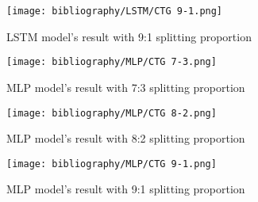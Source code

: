 \documentclass{ieeeojies}
\begin{document}
\begin{figure}[H]
  \centering
  \begin{minipage}{0.8\linewidth}
    \centering
    \texttt{[image: bibliography/LSTM/CTG 9-1.png]}
    \caption{LSTM model's result with 9:1 splitting proportion}
    \label{fig8}
  \end{minipage}
\end{figure}


\begin{figure}[H]
  \centering
  \begin{minipage}{0.8\linewidth}
    \centering
    \texttt{[image: bibliography/MLP/CTG 7-3.png]}
    \caption{MLP model's result with 7:3 splitting proportion}
    \label{fig8}
  \end{minipage}
\end{figure}

\begin{figure}[H]
  \centering
  \begin{minipage}{0.8\linewidth}
    \centering
    \texttt{[image: bibliography/MLP/CTG 8-2.png]}
    \caption{MLP model's result with 8:2 splitting proportion}
    \label{fig8}
  \end{minipage}
\end{figure}

\begin{figure}[H]
  \centering
  \begin{minipage}{0.8\linewidth}
    \centering
    \texttt{[image: bibliography/MLP/CTG 9-1.png]}
    \caption{MLP model's result with 9:1 splitting proportion}
    \label{fig8}
  \end{minipage}
\end{figure}
\end{document}
